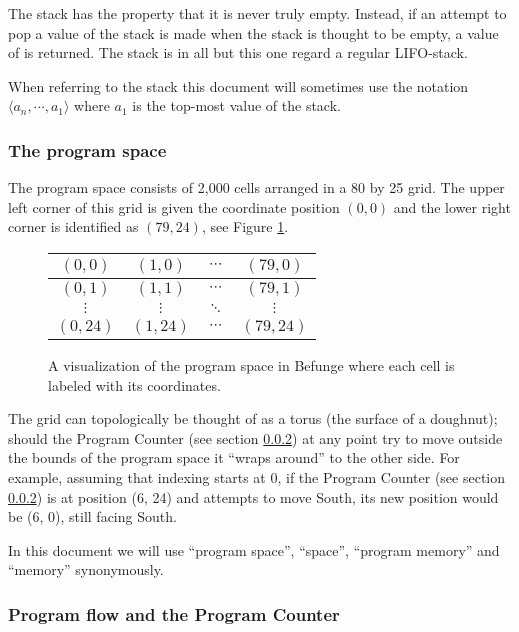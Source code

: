 \documentclass[12pt, a4paper]{article}
\begin{document}
The stack has the property that it is never truly empty. Instead, if an attempt to pop a value of the stack is made when the stack is thought to be empty, a value of  is returned. The stack is in all but this one regard a regular LIFO-stack.

When referring to the stack this document will sometimes use the notation $\langle a_n, \cdots, a_1 \rangle$ where $a_1$ is the top-most value of the stack.

\subsubsection{The program space}
\label{sec:space}

The program space consists of 2,000 cells arranged in a 80 by 25 grid. The upper left corner of this grid is given the coordinate position $(0, 0)$ and the lower right corner is identified as $(79, 24)$, see Figure \ref{fig:grid}.

\begin{figure}[!ht]
\centering
\begin{tabular}{|c|c|c|c|}
\hline
$(0, 0)$ & $(1, 0)$ & $\cdots$ & $(79, 0)$\\
\hline
$(0, 1)$ & $(1, 1)$ & $\cdots$ & $(79, 1)$\\
\hline
$\vdots$ & $\vdots$ & $\ddots$ & $\vdots$\\
\hline
$(0, 24)$ & $(1, 24)$ & $\cdots$ & $(79, 24)$\\
\hline
\end{tabular}
\caption{A visualization of the program space in Befunge where each cell is labeled with its coordinates.}
\label{fig:grid}
\end{figure}

The grid can topologically be thought of as a torus (the surface of a doughnut); should the Program Counter (see section \ref{sec:pc}) at any point try to move outside the bounds of the program space it “wraps around” to the other side. For example, assuming that indexing starts at 0, if the Program Counter (see section \ref{sec:pc}) is at position (6, 24) and attempts to move South, its new position would be (6, 0), still facing South.

In this document we will use “program space”, “space”, “program memory” and “memory” synonymously.

\subsubsection{Program flow and the Program Counter}
\label{sec:pc}
\end{document}
